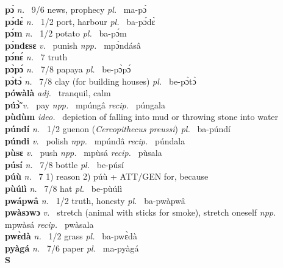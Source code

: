 {\bfseries pɔ́}  {\itshape n.~} 9/6 news, prophecy {\itshape pl.~} ma-pɔ́    \\ 
{\bfseries pɔ́dɛ̀}  {\itshape n.~} 1/2 port, harbour {\itshape pl.~} ba-pɔ́dɛ̀    \\ 
{\bfseries pɔ́m}  {\itshape n.~} 1/2 potato {\itshape pl.~} ba-pɔ́m    \\ 
{\bfseries pɔ́ndɛsɛ}  {\itshape v.~} punish   {\itshape npp.~} mpɔ́ndásâ  \\ 
{\bfseries pɔ́nɛ́}  {\itshape n.~} 7 truth    \\ 
{\bfseries pɔ̀pɔ́}  {\itshape n.~} 7/8 papaya {\itshape pl.~} be-pɔ̀pɔ́    \\ 
{\bfseries pɔ̀tɔ̀}  {\itshape n.~} 7/8 clay (for building houses) {\itshape pl.~} be-pɔ̀tɔ̀    \\ 
{\bfseries pówàlà}  {\itshape adj.~} tranquil, calm    \\ 
{\bfseries púɔ̃̀}  {\itshape v.~} pay   {\itshape npp.~} mpúngâ {\itshape recip.~} púngala \\ 
{\bfseries pùdùm}  {\itshape ideo.~} depiction of falling into mud or throwing stone into water    \\ 
{\bfseries púndí}  {\itshape n.~} 1/2 guenon ({\itshape Cercopithecus preussi}) {\itshape pl.~} ba-púndí    \\ 
{\bfseries púndi}  {\itshape v.~} polish   {\itshape npp.~} mpúndâ {\itshape recip.~} púndala  \\ 
{\bfseries pùsɛ}  {\itshape v.~} push   {\itshape npp.~} mpùsá {\itshape recip.~} pùsala  \\ 
{\bfseries púsí}  {\itshape n.~} 7/8 bottle {\itshape pl.~} be-púsí    \\ 
{\bfseries púù}  {\itshape n.~} 7 1) reason 2) púù + ATT/GEN for, because    \\ 
{\bfseries pùúlì}  {\itshape n.~} 7/8 hat {\itshape pl.~} be-pùúlì    \\ 
{\bfseries pwápwâ}  {\itshape n.~} 1/2 truth, honesty {\itshape pl.~} ba-pwàpwâ    \\ 
{\bfseries pwàsɔwɔ}  {\itshape v.~} stretch (animal with sticks for smoke), stretch oneself   {\itshape npp.~} mpwàsá {\itshape recip.~} pwàsala  \\ 
{\bfseries pwɛ̀dà}  {\itshape n.~} 1/2 grass {\itshape pl.~} ba-pwɛ̀dà    \\ 
{\bfseries pyàgá}  {\itshape n.~} 7/6 paper {\itshape pl.~} ma-pyàgá    \\ 


\medskip
\noindent \large {\bfseries S}\normalsize\\
\medskip

